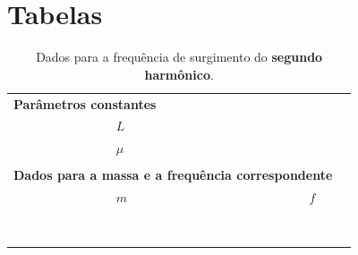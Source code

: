 \section{Tabelas}

\begin{table}[!htb]
\caption{Dados para a frequência de surgimento do \textbf{segundo harmônico}.}
\label{Tab:FrequenciaFuncaoMassa}
	\begin{center}
		\begin{tabular}{cp{45mm}p{45mm}c}
		\toprule
\multicolumn{2}{l}{\textbf{Parâmetros constantes}}&&\\
		\cmidrule{2-3}
		& \cellcolor[gray]{0.89}$L$ &\cellcolor[gray]{0.92} \\
		& \cellcolor[gray]{0.95}$\mu$ & \cellcolor[gray]{0.97}\\
		\cmidrule{2-3}
		\\
\multicolumn{3}{l}{\textbf{Dados para a massa e a frequência correspondente}} \\
		\cmidrule{2-3}		
		& $m$ & $f$ \\
		\cmidrule{2-3}
		& \cellcolor[gray]{0.89} & \cellcolor[gray]{0.92} \\
		& \cellcolor[gray]{0.95} & \cellcolor[gray]{0.97} \\
		& \cellcolor[gray]{0.89} & \cellcolor[gray]{0.92} \\
		& \cellcolor[gray]{0.95} & \cellcolor[gray]{0.97} \\
		& \cellcolor[gray]{0.89} & \cellcolor[gray]{0.92} \\
		& \cellcolor[gray]{0.95} & \cellcolor[gray]{0.97} \\
		& \cellcolor[gray]{0.89} & \cellcolor[gray]{0.92} \\
		& \cellcolor[gray]{0.95} & \cellcolor[gray]{0.97} \\
		\cmidrule{2-3}		
		\bottomrule
		\end{tabular}
	\end{center}
\end{table}

